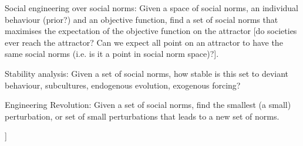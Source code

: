 \documentclass[a4paper]{article}
\begin{document}
Social engineering over social norms: Given a space of social norms, an individual behaviour (prior?) and an objective function, find a set of social norms that maximises the expectation of the objective function on the attractor [do societies ever reach the attractor? Can we expect all point on an attractor to have the same social norms (i.e. is it a point in social norm space)?]. 

Stability analysis: Given a set of social norms, how stable is this set to deviant behaviour, subcultures, endogenous evolution, exogenous forcing?

Engineering Revolution: Given a set of social norms, find the smallest (a small) perturbation, or set of small perturbations that leads to a new set of norms.

]


\end{document}
